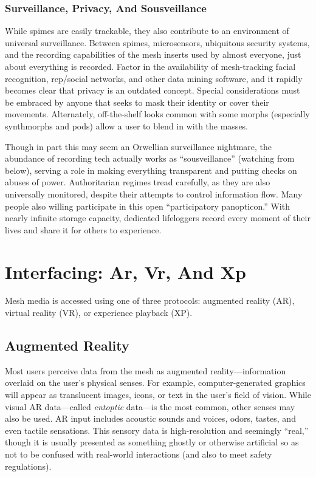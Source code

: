 \subsubsection{Surveillance, Privacy, And Sousveillance}

While spimes are easily trackable, they also contribute
to an environment of universal surveillance.
Between spimes, microsensors, ubiquitous security 
systems, and the recording capabilities of the mesh 
inserts used by almost everyone, just about everything
is recorded. Factor in the availability of mesh-tracking
facial recognition, rep/social networks, and
other data mining software, and it rapidly becomes 
clear that privacy is an outdated concept. Special 
considerations must be embraced by anyone that 
seeks to mask their identity or cover their movements. 
Alternately, off-the-shelf looks common with some 
morphs (especially synthmorphs and pods) allow a 
user to blend in with the masses.

Though in part this may seem an Orwellian surveillance
nightmare, the abundance of recording
tech actually works as ``sousveillance'' (watching 
from below), serving a role in making everything 
transparent and putting checks on abuses of power. 
Authoritarian regimes tread carefully, as they are also 
universally monitored, despite their attempts to control
information flow. Many people also willing participate
in this open ``participatory panopticon.'' With
nearly infinite storage capacity, dedicated lifeloggers 
record every moment of their lives and share it for 
others to experience.

\section{Interfacing: Ar, Vr, And Xp}

Mesh media is accessed using one of three protocols: 
augmented reality (AR), virtual reality (VR), or experience
playback (XP).

\subsection{Augmented Reality}

Most users perceive data from the mesh as augmented
reality—information overlaid on the user's
physical senses. For example, computer-generated 
graphics will appear as translucent images, icons, 
or text in the user's field of vision. While visual AR 
data—called  \textit{entoptic} data—is the most common, 
other senses may also be used. AR input includes 
acoustic sounds and voices, odors, tastes, and 
even tactile sensations. This sensory data is high-resolution
and seemingly ``real,'' though it is usually
presented as something ghostly or otherwise
artificial so as not to be confused with real-world 
interactions (and also to meet safety regulations).

